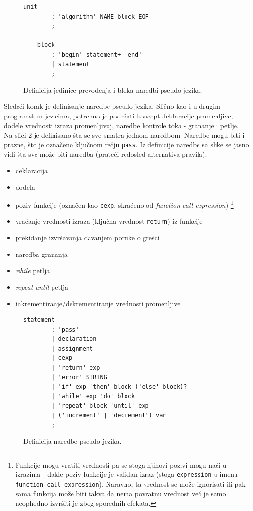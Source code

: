 \begin{figure}[h!]
    \begin{lstlisting}[language={}]
    unit
        : 'algorithm' NAME block EOF
        ;
    
    block
        : 'begin' statement+ 'end'
        | statement
        ;
    \end{lstlisting}
    \caption{Definicija jedinice prevođenja i bloka naredbi pseudo-jezika.}
    \label{fig:PseudoDef1}
\end{figure}

Sledeći korak je definisanje naredbe pseudo-jezika. Slično kao i u drugim programskim jezicima, potrebno je podržati koncept deklaracije promenljive, dodele vrednosti izraza promenljivoj, naredbe kontrole toka - grananje i petlje. Na slici \ref{fig:PseudoDef2} je definisano šta se sve smatra jednom naredbom. Naredbe mogu biti i prazne, što je označeno ključnom rečju \texttt{pass}. Iz definicije naredbe sa slike se jasno vidi šta sve može biti naredba (prateći redosled alternativa pravila):
\begin{itemize}
    \item deklaracija
    \item dodela
    \item poziv funkcije (označen kao \texttt{cexp}, skraćeno od \emph{function call expression}) \footnote{Funkcije mogu vratiti vrednosti pa se stoga njihovi pozivi mogu naći u izrazima - dakle poziv funkcije je validan izraz (stoga \texttt{expression} u imenu \texttt{function call expression}). Naravno, ta vrednost se može ignorisati ili pak sama funkcija može biti takva da nema povratnu vrednost već je samo neophodno izvršiti je zbog sporednih efekata.}
    \item vraćanje vrednosti izraza (ključna vrednost \texttt{return}) iz funkcije
    \item prekidanje izvršavanja davanjem poruke o grešci
    \item naredba grananja
    \item \emph{while} petlja
    \item \emph{repeat-until} petlja
    \item inkrementiranje/dekrementiranje vrednosti promenljive
\end{itemize}
    
\begin{figure}[h!]
    \begin{lstlisting}[language={}]
    statement
        : 'pass'
        | declaration
        | assignment
        | cexp
        | 'return' exp
        | 'error' STRING
        | 'if' exp 'then' block ('else' block)? 
        | 'while' exp 'do' block 
        | 'repeat' block 'until' exp
        | ('increment' | 'decrement') var	
        ;
    \end{lstlisting}
    \caption{Definicija naredbe pseudo-jezika.}
    \label{fig:PseudoDef2}
\end{figure}

